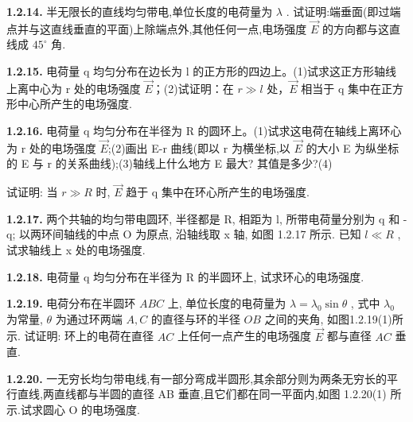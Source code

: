 \vfill

\textbf{1.2.14.} 半无限长的直线均匀带电,单位长度的电荷量为 $\lambda$ . 试证明:端垂面(即过端点并与这直线垂直的平面)上除端点外,其他任何一点,电场强度 $\vec{E}$ 的方向都与这直线成 $45^{\circ}$ 角.

\vfill

\newpage
\textbf{1.2.15.} 电荷量 q 均匀分布在边长为 l 的正方形的四边上。(1)试求这正方形轴线上离中心为 r 处的电场强度 $\vec{E}$；(2)试证明：在 $r \gg l$ 处，$\vec{E}$ 相当于 q 集中在正方形中心所产生的电场强度.

\vfill

\textbf{1.2.16.} 电荷量 q 均匀分布在半径为 R 的圆环上。(1)试求这电荷在轴线上离环心为 r 处的电场强度 $\vec{E}$;(2)画出 E-r 曲线(即以 r 为横坐标,以 $\vec{E}$ 的大小 E 为纵坐标的 E 与 r 的关系曲线);(3)轴线上什么地方 E 最大? 其值是多少?(4)


试证明: 当 $r \gg R$ 时, $\vec{E}$ 趋于 q 集中在环心所产生的电场强度.

\vfill

\newpage
\textbf{1.2.17.} 两个共轴的均匀带电圆环, 半径都是 R, 相距为 l, 所带电荷量分别为 q 和 -q; 以两环间轴线的中点 O 为原点, 沿轴线取 x 轴, 如图 1.2.17 所示. 已知 $l \ll R$ , 试求轴线上 x 处的电场强度.


\begin{center}
\end{center}

\vfill

\textbf{1.2.18.} 电荷量 q 均匀分布在半径为 R 的半圆环上, 试求环心的电场强度.

\vfill

\newpage
\textbf{1.2.19.} 电荷分布在半圆环 $ABC$ 上, 单位长度的电荷量为 $\lambda = \lambda_0\sin \theta$ , 式中 $\lambda_0$ 为常量, $\theta$ 为通过环两端 $A, C$ 的直径与环的半径 $OB$ 之间的夹角, 如图1.2.19(1)所示. 试证明: 环上的电荷在直径 $AC$ 上任何一点产生的电场强度 $\vec{E}$ 都与直径 $AC$ 垂直.



\begin{center}
\end{center}


\vfill

\textbf{1.2.20.} 一无穷长均匀带电线,有一部分弯成半圆形,其余部分则为两条无穷长的平行直线,两直线都与半圆的直径 AB 垂直,且它们都在同一平面内,如图 1.2.20(1) 所示.试求圆心 O 的电场强度.

\vfill

